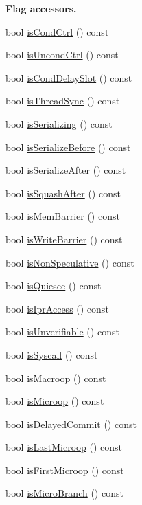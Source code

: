 \begin{Indent}{\bf Flag accessors.}
\begin{DoxyCompactItemize}
bool \hyperlink{classStaticInst_a941920262acf4437e241c7600b3007ff}{isCondCtrl} () const 
\item 
bool \hyperlink{classStaticInst_af53002b2f11733681e8552aa6805a706}{isUncondCtrl} () const 
\item 
bool \hyperlink{classStaticInst_a50a12c82ee75e53f92c0852ae3ea71e8}{isCondDelaySlot} () const 
\item 
bool \hyperlink{classStaticInst_ae1376a5b7bbe66f8bcf8b3517802c85f}{isThreadSync} () const 
\item 
bool \hyperlink{classStaticInst_a0b876c794e1ed62f664670215da8793f}{isSerializing} () const 
\item 
bool \hyperlink{classStaticInst_aa350b74ea660b6821bd37cd139bd917b}{isSerializeBefore} () const 
\item 
bool \hyperlink{classStaticInst_a4d1c24871e03e495a1841ea16d11a68f}{isSerializeAfter} () const 
\item 
bool \hyperlink{classStaticInst_a11c92e1c9e4b69f9cb64a9794f1fef4c}{isSquashAfter} () const 
\item 
bool \hyperlink{classStaticInst_a8bcffaf6f3c61001c56f6199a3221221}{isMemBarrier} () const 
\item 
bool \hyperlink{classStaticInst_aadc753a9e3a0d5bb33b6551fb3ad5f7e}{isWriteBarrier} () const 
\item 
bool \hyperlink{classStaticInst_af032774c8da8aea2d9d84d5f3f211a7f}{isNonSpeculative} () const 
\item 
bool \hyperlink{classStaticInst_adc9467e7b34e8dff3964c85b66bb1b93}{isQuiesce} () const 
\item 
bool \hyperlink{classStaticInst_aa201775c9e5befb0bf84cdd7b24519b3}{isIprAccess} () const 
\item 
bool \hyperlink{classStaticInst_ae9cbcc655cf8d63153d0c3f8bbf59841}{isUnverifiable} () const 
\item 
bool \hyperlink{classStaticInst_afa3ec9c6fc7c50b26c6811c3bf1bb5f0}{isSyscall} () const 
\item 
bool \hyperlink{classStaticInst_a1f7c99c1d36381c9aff41f00261d06df}{isMacroop} () const 
\item 
bool \hyperlink{classStaticInst_a19f74cdac8afa870418c056c72645187}{isMicroop} () const 
\item 
bool \hyperlink{classStaticInst_aebb2ebf9a7a910fcd247833ab88843b3}{isDelayedCommit} () const 
\item 
bool \hyperlink{classStaticInst_ac600348c1afe65d9299c9635d6ea5773}{isLastMicroop} () const 
\item 
bool \hyperlink{classStaticInst_a937b23736e22f67d6b168c0c029deec4}{isFirstMicroop} () const 
\item 
bool \hyperlink{classStaticInst_a369f5792a76744815dbb1bcba6e25618}{isMicroBranch} () const 
\end{DoxyCompactItemize}
\end{Indent}
